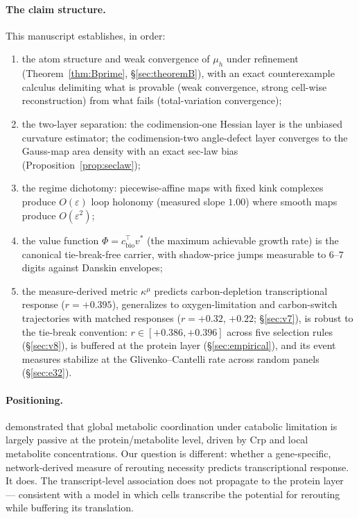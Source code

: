 \documentclass[11pt,a4paper]{article}
\theoremstyle{plain}
\theoremstyle{definition}
\theoremstyle{remark}
\newcommand{\kmu}{\kappa^{\mu}}
\begin{document}
\paragraph{The claim structure.}
This manuscript establishes, in order:
\begin{enumerate}[label=(\roman*)]
\item the atom structure and weak convergence of $\mu_h$
      under refinement (Theorem~\ref{thm:Bprime}, \S\ref{sec:theoremB}), with an exact counterexample calculus delimiting what is provable (weak convergence, strong cell-wise reconstruction) from what fails (total-variation convergence);
\item the two-layer separation: the codimension-one Hessian
      layer is the unbiased curvature estimator; the codimension-two
      angle-defect layer converges to the Gauss-map area density with an
      exact sec-law bias (Proposition~\ref{prop:seclaw});
\item the regime dichotomy: piecewise-affine maps with fixed
      kink complexes produce $O(\varepsilon)$ loop holonomy (measured slope
      $1.00$) where smooth maps produce $O(\varepsilon^2)$;
\item the value function $\Phi = c_{\mathrm{bio}}^\top v^*$
      (the maximum achievable growth rate)
      is the canonical tie-break-free carrier, with shadow-price jumps
      measurable to $6$--$7$ digits against Danskin envelopes;
\item the measure-derived metric $\kmu$ predicts
      carbon-depletion transcriptional response ($r = +0.395$),
      generalizes to oxygen-limitation and carbon-switch trajectories
      with matched responses ($r = +0.32$, $+0.22$; \S\ref{sec:v7}), is
      robust to the tie-break convention: $r \in [+0.386, +0.396]$
      across five selection rules (\S\ref{sec:v8}), is buffered at the
      protein layer
      (\S\ref{sec:empirical}), and its event measures stabilize at
      the Glivenko--Cantelli rate across random panels (\S\ref{sec:e32}).
\end{enumerate}

\paragraph{Positioning.}
\citet{kochanowski2013} demonstrated that global metabolic coordination under
catabolic limitation is largely passive at the protein/metabolite level,
driven by Crp and local metabolite concentrations. Our question is different: whether a gene-specific, network-derived
measure of rerouting necessity predicts transcriptional response. It
does. The transcript-level association does not
propagate to the protein layer --- consistent with a model in
which cells transcribe the potential for rerouting while buffering
its translation.
\end{document}
